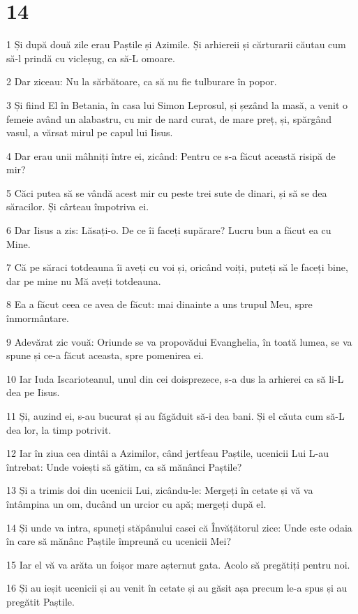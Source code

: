 \chapter{14}

\par 1 Și după două zile erau Paștile și Azimile. Și arhiereii și cărturarii căutau cum să-l prindă cu vicleșug, ca să-L omoare.
\par 2 Dar ziceau: Nu la sărbătoare, ca să nu fie tulburare în popor.
\par 3 Și fiind El în Betania, în casa lui Simon Leprosul, și șezând la masă, a venit o femeie având un alabastru, cu mir de nard curat, de mare preț, și, spărgând vasul, a vărsat mirul pe capul lui Iisus.
\par 4 Dar erau unii mâhniți între ei, zicând: Pentru ce s-a făcut această risipă de mir?
\par 5 Căci putea să se vândă acest mir cu peste trei sute de dinari, și să se dea săracilor. Și cârteau împotriva ei.
\par 6 Dar Iisus a zis: Lăsați-o. De ce îi faceți supărare? Lucru bun a făcut ea cu Mine.
\par 7 Că pe săraci totdeauna îi aveți cu voi și, oricând voiți, puteți să le faceți bine, dar pe mine nu Mă aveți totdeauna.
\par 8 Ea a făcut ceea ce avea de făcut: mai dinainte a uns trupul Meu, spre înmormântare.
\par 9 Adevărat zic vouă: Oriunde se va propovădui Evanghelia, în toată lumea, se va spune și ce-a făcut aceasta, spre pomenirea ei.
\par 10 Iar Iuda Iscarioteanul, unul din cei doisprezece, s-a dus la arhierei ca să li-L dea pe Iisus.
\par 11 Și, auzind ei, s-au bucurat și au făgăduit să-i dea bani. Și el căuta cum să-L dea lor, la timp potrivit.
\par 12 Iar în ziua cea dintâi a Azimilor, când jertfeau Paștile, ucenicii Lui L-au întrebat: Unde voiești să gătim, ca să mănânci Paștile?
\par 13 Și a trimis doi din ucenicii Lui, zicându-le: Mergeți în cetate și vă va întâmpina un om, ducând un urcior cu apă; mergeți după el.
\par 14 Și unde va intra, spuneți stăpânului casei că Învățătorul zice: Unde este odaia în care să mănânc Paștile împreună cu ucenicii Mei?
\par 15 Iar el vă va arăta un foișor mare așternut gata. Acolo să pregătiți pentru noi.
\par 16 Și au ieșit ucenicii și au venit în cetate și au găsit așa precum le-a spus și au pregătit Paștile.
